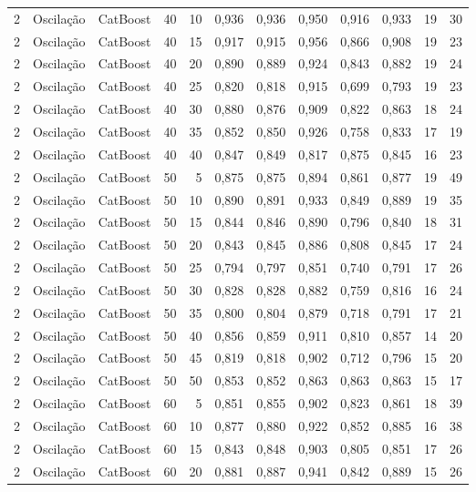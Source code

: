 \begin{longtable}{ccclrrrrrrrr}
2 & Oscilação & CatBoost & 40 & 10 & 0,936 & 0,936 & 0,950 & 0,916 & 0,933 & 19 & 30 \\
2 & Oscilação & CatBoost & 40 & 15 & 0,917 & 0,915 & 0,956 & 0,866 & 0,908 & 19 & 23 \\
2 & Oscilação & CatBoost & 40 & 20 & 0,890 & 0,889 & 0,924 & 0,843 & 0,882 & 19 & 24 \\
2 & Oscilação & CatBoost & 40 & 25 & 0,820 & 0,818 & 0,915 & 0,699 & 0,793 & 19 & 23 \\
2 & Oscilação & CatBoost & 40 & 30 & 0,880 & 0,876 & 0,909 & 0,822 & 0,863 & 18 & 24 \\
2 & Oscilação & CatBoost & 40 & 35 & 0,852 & 0,850 & 0,926 & 0,758 & 0,833 & 17 & 19 \\
2 & Oscilação & CatBoost & 40 & 40 & 0,847 & 0,849 & 0,817 & 0,875 & 0,845 & 16 & 23 \\
2 & Oscilação & CatBoost & 50 & 5 & 0,875 & 0,875 & 0,894 & 0,861 & 0,877 & 19 & 49 \\
2 & Oscilação & CatBoost & 50 & 10 & 0,890 & 0,891 & 0,933 & 0,849 & 0,889 & 19 & 35 \\
2 & Oscilação & CatBoost & 50 & 15 & 0,844 & 0,846 & 0,890 & 0,796 & 0,840 & 18 & 31 \\
2 & Oscilação & CatBoost & 50 & 20 & 0,843 & 0,845 & 0,886 & 0,808 & 0,845 & 17 & 24 \\
2 & Oscilação & CatBoost & 50 & 25 & 0,794 & 0,797 & 0,851 & 0,740 & 0,791 & 17 & 26 \\
2 & Oscilação & CatBoost & 50 & 30 & 0,828 & 0,828 & 0,882 & 0,759 & 0,816 & 16 & 24 \\
2 & Oscilação & CatBoost & 50 & 35 & 0,800 & 0,804 & 0,879 & 0,718 & 0,791 & 17 & 21 \\
2 & Oscilação & CatBoost & 50 & 40 & 0,856 & 0,859 & 0,911 & 0,810 & 0,857 & 14 & 20 \\
2 & Oscilação & CatBoost & 50 & 45 & 0,819 & 0,818 & 0,902 & 0,712 & 0,796 & 15 & 20 \\
2 & Oscilação & CatBoost & 50 & 50 & 0,853 & 0,852 & 0,863 & 0,863 & 0,863 & 15 & 17 \\
2 & Oscilação & CatBoost & 60 & 5 & 0,851 & 0,855 & 0,902 & 0,823 & 0,861 & 18 & 39 \\
2 & Oscilação & CatBoost & 60 & 10 & 0,877 & 0,880 & 0,922 & 0,852 & 0,885 & 16 & 38 \\
2 & Oscilação & CatBoost & 60 & 15 & 0,843 & 0,848 & 0,903 & 0,805 & 0,851 & 17 & 26 \\
2 & Oscilação & CatBoost & 60 & 20 & 0,881 & 0,887 & 0,941 & 0,842 & 0,889 & 15 & 26 \\

\end{longtable}
